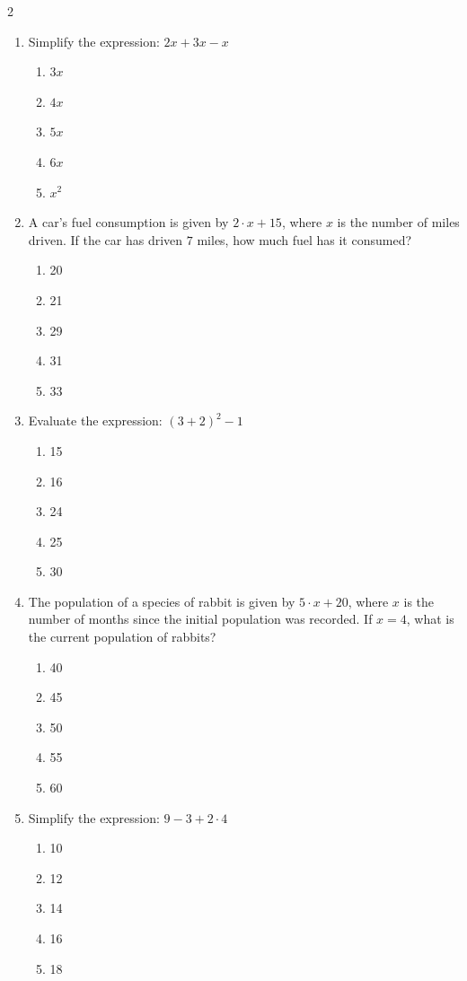 \documentclass[10pt]{article}
\begin{document}
\begin{multicols}{2}
\begin{enumerate}[label=\textbf{Q\arabic*.}, leftmargin=*, itemsep=6pt, parsep=0pt]
  \item \small Simplify the expression: $2x + 3x - x$
  \begin{enumerate}[label=(\Alph*), leftmargin=0.6cm, nosep, itemsep=2pt]
    \item $3x$
    \item $4x$
    \item $5x$
    \item $6x$
    \item $x^2$
  \end{enumerate}

  \item \small A car's fuel consumption is given by $2 \cdot x + 15$, where $x$ is the number of miles driven. If the car has driven $7$ miles, how much fuel has it consumed?
  \begin{enumerate}[label=(\Alph*), leftmargin=0.6cm, nosep, itemsep=2pt]
    \item 20
    \item 21
    \item 29
    \item 31
    \item 33
  \end{enumerate}

  \item \small Evaluate the expression: $(3 + 2)^2 - 1$
  \begin{enumerate}[label=(\Alph*), leftmargin=0.6cm, nosep, itemsep=2pt]
    \item 15
    \item 16
    \item 24
    \item 25
    \item 30
  \end{enumerate}

  \item \small The population of a species of rabbit is given by $5 \cdot x + 20$, where $x$ is the number of months since the initial population was recorded. If $x = 4$, what is the current population of rabbits?
  \begin{enumerate}[label=(\Alph*), leftmargin=0.6cm, nosep, itemsep=2pt]
    \item 40
    \item 45
    \item 50
    \item 55
    \item 60
  \end{enumerate}

  \item \small Simplify the expression: $9 - 3 + 2 \cdot 4$
  \begin{enumerate}[label=(\Alph*), leftmargin=0.6cm, nosep, itemsep=2pt]
    \item 10
    \item 12
    \item 14
    \item 16
    \item 18
  \end{enumerate}


\end{enumerate}
\end{multicols}
\end{document}
